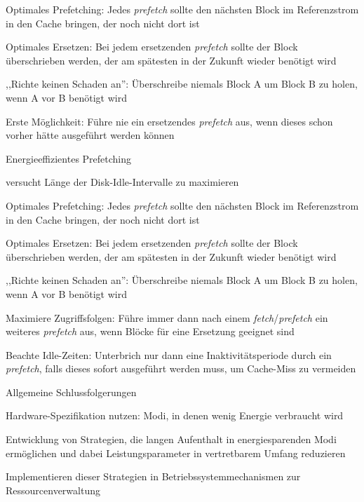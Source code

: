 \documentclass[a4paper]{article}
\begin{document}
\begin{multicols}{3}
\begin{itemize*}
\begin{itemize*}
\begin{itemize*}
            \end{itemize*}
        \end{itemize*}
        \begin{enumerate*}
            \item Optimales Prefetching: Jedes \emph{prefetch} sollte den nächsten Block im Referenzstrom in den Cache bringen, der noch nicht dort ist
            \item Optimales Ersetzen: Bei jedem ersetzenden \emph{prefetch} sollte der Block überschrieben werden, der am spätesten in der Zukunft wieder benötigt wird
            \item ,,Richte keinen Schaden an'': Überschreibe niemals Block A um Block B zu holen, wenn A vor B benötigt wird
            \item Erste Möglichkeit: Führe nie ein ersetzendes \emph{prefetch} aus, wenn dieses schon vorher hätte ausgeführt werden können
        \end{enumerate*}
        \item Energieeffizientes Prefetching
        \begin{itemize*}
            \item versucht Länge der Disk-Idle-Intervalle zu maximieren
        \end{itemize*}
        \begin{enumerate*}
            \item Optimales Prefetching: Jedes \emph{prefetch} sollte den nächsten Block im Referenzstrom in den Cache bringen, der noch nicht dort ist
            \item Optimales Ersetzen: Bei jedem ersetzenden \emph{prefetch} sollte der Block überschrieben werden, der am spätesten in der Zukunft wieder benötigt wird
            \item ,,Richte keinen Schaden an'': Überschreibe niemals Block A um Block B zu holen, wenn A vor B benötigt wird
            \item Maximiere Zugriffsfolgen: Führe immer dann nach einem \emph{fetch}/\emph{prefetch} ein weiteres \emph{prefetch} aus, wenn Blöcke für eine Ersetzung geeignet sind
            \item Beachte Idle-Zeiten: Unterbrich nur dann eine Inaktivitätsperiode durch ein \emph{prefetch}, falls dieses sofort ausgeführt werden muss, um Cache-Miss zu vermeiden
        \end{enumerate*}
    \end{itemize*}
    Allgemeine Schlussfolgerungen
    \begin{enumerate*}
        \item Hardware-Spezifikation nutzen: Modi, in denen wenig Energie verbraucht wird
        \item Entwicklung von Strategien, die langen Aufenthalt in energiesparenden Modi ermöglichen und dabei Leistungsparameter in vertretbarem Umfang reduzieren
        \item Implementieren dieser Strategien in Betriebssystemmechanismen zur Ressourcenverwaltung
    \end{enumerate*}


\end{multicols}
\end{document}
